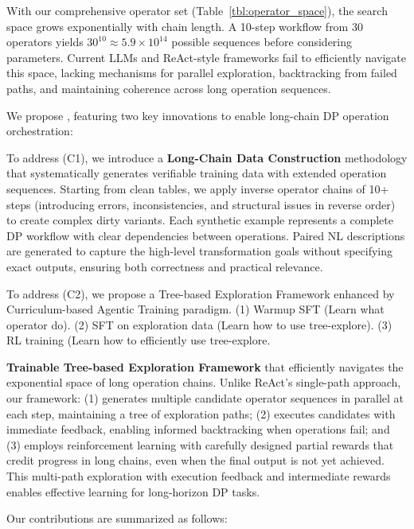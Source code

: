  With our comprehensive operator set (Table~\ref{tbl:operator_space}), the search space grows exponentially with chain length. A 10-step workflow from 30 operators yields $30^{10} \approx 5.9 \times 10^{14}$ possible sequences before considering parameters. Current LLMs and ReAct-style frameworks fail to efficiently navigate this space, lacking mechanisms for parallel exploration, backtracking from failed paths, and maintaining coherence across long operation sequences.

 We propose \sys, featuring two key innovations to enable long-chain DP operation orchestration:

To address (C1), we introduce a \textbf{Long-Chain Data Construction} methodology that systematically generates verifiable training data with extended operation sequences. Starting from clean tables, we apply inverse operator chains of 10+ steps (introducing errors, inconsistencies, and structural issues in reverse order) to create complex dirty variants. Each synthetic example represents a complete DP workflow with clear dependencies between operations. Paired NL descriptions are generated to capture the high-level transformation goals without specifying exact outputs, ensuring both correctness and practical relevance.

To address (C2), we propose a Tree-based Exploration Framework enhanced by Curriculum-based Agentic Training paradigm. (1) Warmup SFT (Learn what operator do). (2) SFT on exploration data (Learn how to use tree-explore).  (3) RL training (Learn how to efficiently use tree-explore. 

\textbf{Trainable Tree-based Exploration Framework} that efficiently navigates the exponential space of long operation chains. Unlike ReAct's single-path approach, our framework: (1) generates multiple candidate operator sequences in parallel at each step, maintaining a tree of exploration paths; (2) executes candidates with immediate feedback, enabling informed backtracking when operations fail; and (3) employs reinforcement learning with carefully designed partial rewards that credit progress in long chains, even when the final output is not yet achieved. This multi-path exploration with execution feedback and intermediate rewards enables effective learning for long-horizon DP tasks.

 Our contributions are summarized as follows:

